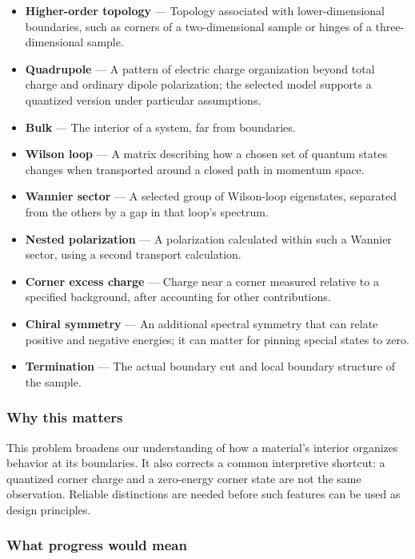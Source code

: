 \documentclass[
  11pt,
]{article}
\begin{document}
\begin{itemize}
\item
  \textbf{Higher-order topology} --- Topology associated with
  lower-dimensional boundaries, such as corners of a two-dimensional
  sample or hinges of a three-dimensional sample.
\item
  \textbf{Quadrupole} --- A pattern of electric charge organization
  beyond total charge and ordinary dipole polarization; the selected
  model supports a quantized version under particular assumptions.
\item
  \textbf{Bulk} --- The interior of a system, far from boundaries.
\item
  \textbf{Wilson loop} --- A matrix describing how a chosen set of
  quantum states changes when transported around a closed path in
  momentum space.
\item
  \textbf{Wannier sector} --- A selected group of Wilson-loop
  eigenstates, separated from the others by a gap in that loop's
  spectrum.
\item
  \textbf{Nested polarization} --- A polarization calculated within such
  a Wannier sector, using a second transport calculation.
\item
  \textbf{Corner excess charge} --- Charge near a corner measured
  relative to a specified background, after accounting for other
  contributions.
\item
  \textbf{Chiral symmetry} --- An additional spectral symmetry that can
  relate positive and negative energies; it can matter for pinning
  special states to zero.
\item
  \textbf{Termination} --- The actual boundary cut and local boundary
  structure of the sample.
\end{itemize}

\subsubsection{Why this matters}

This problem broadens our understanding of how a material's interior
organizes behavior at its boundaries. It also corrects a common
interpretive shortcut: a quantized corner charge and a zero-energy
corner state are not the same observation. Reliable distinctions are
needed before such features can be used as design principles.

\subsubsection{What progress would mean}
\end{document}
